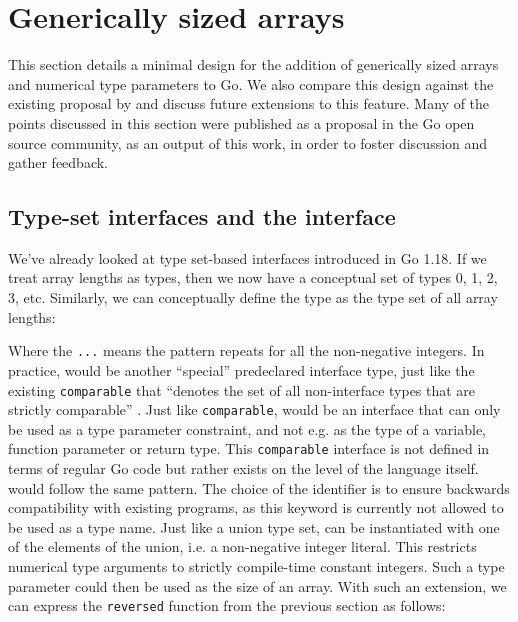 \section{Generically sized arrays}
\label{ch:proposal}

This section details a minimal design for the addition of generically sized
arrays and numerical type parameters to Go. We also compare this design against
the existing proposal by \autocite{goArrayProposal} and discuss future
extensions to this feature. Many of the points discussed in this section were
published as a proposal in the Go open source community, as an output of this
work, in order to foster discussion and gather feedback.

\subsection{Type-set interfaces and the  interface}

We've already looked at type set-based interfaces introduced in Go 1.18. If we
treat array lengths as types, then we now have a conceptual set of types 0, 1, 2,
3, etc. Similarly, we can conceptually define the  type as the type
set of all array lengths:


Where the \texttt{...} means the pattern repeats for all the non-negative
integers. In practice,  would be another ``special'' predeclared
interface type, just like the existing \texttt{comparable} that ``denotes the
set of all non-interface types that are strictly comparable'' \autocite{spec}.
Just like \texttt{comparable},  would be an interface that can only be
used as a type parameter constraint, and not e.g. as the type of a variable,
function parameter or return type. This \texttt{comparable} interface is not
defined in terms of regular Go code but rather exists on the level of the
language itself.  would follow the same pattern. The choice of the
identifier  is to ensure backwards compatibility with existing
programs, as this keyword is currently not allowed to be used as a type name.
Just like a union type set,  can be instantiated with one of the
elements of the union, i.e. a non-negative integer literal. This restricts
numerical type arguments to strictly compile-time constant integers. Such a type
parameter could then be used as the size of an array. With such an extension, we
can express the \texttt{reversed} function from the previous section as follows:

